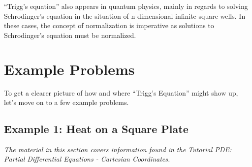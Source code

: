 \documentclass[11pt]{report}
\begin{document}
``Trigg's equation'' also appears in quantum physics, mainly in regards to solving Schrodinger's equation in the situation of n-dimensional infinite square wells. In these cases, the concept of normalization is imperative as solutions to Schrodinger's equation must be normalized.



\section{Example Problems}

To get a clearer picture of how and where ``Trigg's Equation'' might show up, let's move on to a few example problems.


\subsection{Example 1: Heat on a Square Plate}

\emph{The material in this section covers information found in the Tutorial PDE: Partial Differential Equations - Cartesian Coordinates.}\\
\end{document}
